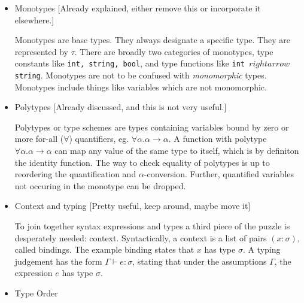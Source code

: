 \documentclass{l4proj}
\begin{document}
\begin{itemize}
    \item Monotypes [Already explained, either remove this or incorporate it elsewhere.]
    
    Monotypes are base types.
    They always designate a specific type.
    They are represented by $\tau$.
    There are broadly two categories of monotypes, type constants like \texttt{int, string, bool}, and type functions like \texttt{int $rightarrow$ string}.
    Monotypes are not to be confused with \emph{monomorphic} types.
    Monotypes include things like variables which are not monomorphic.

    \item Polytypes [Already discussed, and this is not very useful.]
    
    Polytypes or type schemes are types containing variables bound by zero or more for-all ($\forall$) quantifiers, eg. $\forall \alpha . \alpha \rightarrow \alpha$.
    A function with polytype $\forall \alpha . \alpha \rightarrow \alpha$ can map any value of the same type to itself, which is by definiton the identity function.
    The way to check equality of polytypes is up to reordering the quantification and $\alpha$-conversion.
    Further, quantified variables not occuring in the monotype can be dropped.
    \item Context and typing [Pretty useful, keep around, maybe move it]
    
    To join together syntax expressions and types a third piece of the puzzle is desperately needed: context.
    Syntactically, a context is a list of pairs $(x : \sigma)$, called bindings.
    The example binding states that $x$ has type $\sigma$.
    A typing judgement has the form $\Gamma \vdash e : \sigma$, stating that under the assumptions $\Gamma$, the expression $e$ has type $\sigma$.
    
    \item Type Order
    

\end{itemize}
\end{document}
